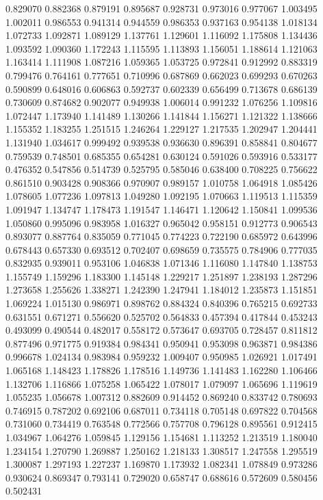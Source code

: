 0.829070
0.882368
0.879191
0.895687
0.928731
0.973016
0.977067
1.003495
1.002011
0.986553
0.941314
0.944559
0.986353
0.937163
0.954138
1.018134
1.072733
1.092871
1.089129
1.137761
1.129601
1.116092
1.175808
1.134436
1.093592
1.090360
1.172243
1.115595
1.113893
1.156051
1.188614
1.121063
1.163414
1.111908
1.087216
1.059365
1.053725
0.972841
0.912992
0.883319
0.799476
0.764161
0.777651
0.710996
0.687869
0.662023
0.699293
0.670263
0.590899
0.648016
0.606863
0.592737
0.602339
0.656499
0.713678
0.686139
0.730609
0.874682
0.902077
0.949938
1.006014
0.991232
1.076256
1.109816
1.072447
1.173940
1.141489
1.130266
1.141844
1.156271
1.121322
1.138666
1.155352
1.183255
1.251515
1.246264
1.229127
1.217535
1.202947
1.204441
1.131940
1.034617
0.999492
0.939538
0.936630
0.896391
0.858841
0.804677
0.759539
0.748501
0.685355
0.654281
0.630124
0.591026
0.593916
0.533177
0.476352
0.547856
0.514739
0.525795
0.585046
0.638400
0.708225
0.756622
0.861510
0.903428
0.908366
0.970907
0.989157
1.010758
1.064918
1.085426
1.078605
1.077236
1.097813
1.049280
1.092195
1.070663
1.119513
1.115359
1.091947
1.134747
1.178473
1.191547
1.146471
1.120642
1.150841
1.099536
1.050860
0.995096
0.983958
1.016327
0.965042
0.958151
0.912773
0.906543
0.893077
0.887764
0.835059
0.771045
0.774223
0.722190
0.685972
0.643996
0.678443
0.657330
0.693512
0.702407
0.698659
0.735575
0.784906
0.777035
0.832935
0.939011
0.953106
1.046838
1.071346
1.116080
1.147840
1.138753
1.155749
1.159296
1.183300
1.145148
1.229217
1.251897
1.238193
1.287296
1.273658
1.255626
1.338271
1.242390
1.247941
1.184012
1.235873
1.151851
1.069224
1.015130
0.986971
0.898762
0.884324
0.840396
0.765215
0.692733
0.631551
0.671271
0.556620
0.525702
0.564833
0.457394
0.417844
0.453243
0.493099
0.490544
0.482017
0.558172
0.573647
0.693705
0.728457
0.811812
0.877496
0.971775
0.919384
0.984341
0.950941
0.953098
0.963871
0.984386
0.996678
1.024134
0.983984
0.959232
1.009407
0.950985
1.026921
1.017491
1.065168
1.148423
1.178826
1.178516
1.149736
1.141483
1.162280
1.106466
1.132706
1.116866
1.075258
1.065422
1.078017
1.079097
1.065696
1.119619
1.055235
1.056678
1.007312
0.882609
0.914452
0.869240
0.833742
0.780693
0.746915
0.787202
0.692106
0.687011
0.734118
0.705148
0.697822
0.704568
0.731060
0.734419
0.763548
0.772566
0.757708
0.796128
0.895561
0.912415
1.034967
1.064276
1.059845
1.129156
1.154681
1.113252
1.213519
1.180040
1.234154
1.270790
1.269887
1.250162
1.218133
1.308517
1.247558
1.295519
1.300087
1.297193
1.227237
1.169870
1.173932
1.082341
1.078849
0.973286
0.930624
0.869347
0.793141
0.729020
0.658747
0.688616
0.572609
0.580456
0.502431
